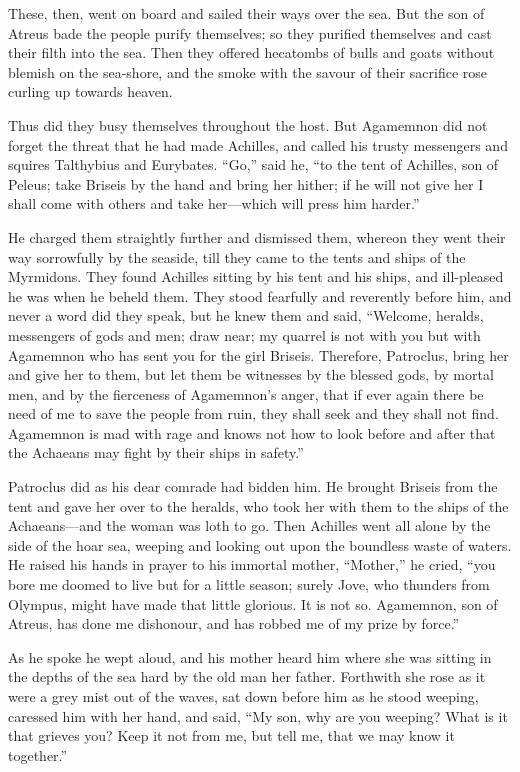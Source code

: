 These, then, went on board and sailed their ways over the sea. But the son
of Atreus bade the people purify themselves; so they purified themselves
and cast their filth into the sea. Then they offered hecatombs of bulls
and goats without blemish on the sea-shore, and the smoke with the savour
of their sacrifice rose curling up towards heaven.

Thus did they busy themselves throughout the host. But Agamemnon did not
forget the threat that he had made Achilles, and called his trusty
messengers and squires Talthybius and Eurybates. “Go,” said he, “to the
tent of Achilles, son of Peleus; take Briseis by the hand and bring her
hither; if he will not give her I shall come with others and take her—which
will press him harder.”

He charged them straightly further and dismissed them, whereon they went
their way sorrowfully by the seaside, till they came to the tents and
ships of the Myrmidons. They found Achilles sitting by his tent and his
ships, and ill-pleased he was when he beheld them. They stood fearfully
and reverently before him, and never a word did they speak, but he knew
them and said, “Welcome, heralds, messengers of gods and men; draw near;
my quarrel is not with you but with Agamemnon who has sent you for the
girl Briseis. Therefore, Patroclus, bring her and give her to them, but
let them be witnesses by the blessed gods, by mortal men, and by the
fierceness of Agamemnon’s anger, that if ever again there be need of me to
save the people from ruin, they shall seek and they shall not find.
Agamemnon is mad with rage and knows not how to look before and after that
the Achaeans may fight by their ships in safety.”

Patroclus did as his dear comrade had bidden him. He brought Briseis from
the tent and gave her over to the heralds, who took her with them to the
ships of the Achaeans—and the woman was loth to go. Then Achilles
went all alone by the side of the hoar sea, weeping and looking out upon
the boundless waste of waters. He raised his hands in prayer to his
immortal mother, “Mother,” he cried, “you bore me doomed to live but for a
little season; surely Jove, who thunders from Olympus, might have made
that little glorious. It is not so. Agamemnon, son of Atreus, has done me
dishonour, and has robbed me of my prize by force.”

As he spoke he wept aloud, and his mother heard him where she was sitting
in the depths of the sea hard by the old man her father. Forthwith she
rose as it were a grey mist out of the waves, sat down before him as he
stood weeping, caressed him with her hand, and said, “My son, why are you
weeping? What is it that grieves you? Keep it not from me, but tell me,
that we may know it together.”


